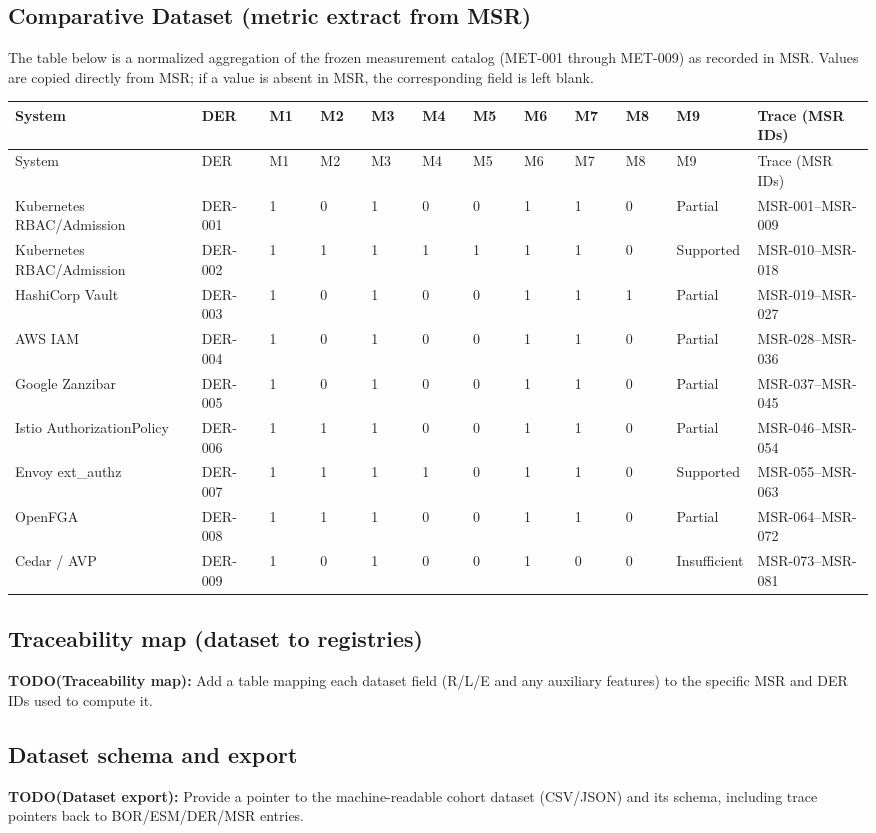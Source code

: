 \subsection{Comparative Dataset (metric extract from MSR)}
The table below is a normalized aggregation of the frozen measurement catalog (MET-001 through MET-009) as recorded in MSR. Values are copied directly from MSR; if a value is absent in MSR, the corresponding field is left blank.

\begin{center}
\begin{longtable}{@{}p{0.22\linewidth}p{0.08\linewidth}p{0.06\linewidth}p{0.06\linewidth}p{0.06\linewidth}p{0.06\linewidth}p{0.06\linewidth}p{0.06\linewidth}p{0.06\linewidth}p{0.06\linewidth}p{0.08\linewidth}p{0.18\linewidth}@{}}
\toprule
System & DER & M1 & M2 & M3 & M4 & M5 & M6 & M7 & M8 & M9 & Trace (MSR IDs)\\
\midrule
\endfirsthead
\toprule
System & DER & M1 & M2 & M3 & M4 & M5 & M6 & M7 & M8 & M9 & Trace (MSR IDs)\\
\midrule
\endhead
\bottomrule
\endfoot
\bottomrule
\endlastfoot
Kubernetes RBAC/Admission & DER-001 & 1 & 0 & 1 & 0 & 0 & 1 & 1 & 0 & Partial & MSR-001--MSR-009\\
Kubernetes RBAC/Admission & DER-002 & 1 & 1 & 1 & 1 & 1 & 1 & 1 & 0 & Supported & MSR-010--MSR-018\\
HashiCorp Vault & DER-003 & 1 & 0 & 1 & 0 & 0 & 1 & 1 & 1 & Partial & MSR-019--MSR-027\\
AWS IAM & DER-004 & 1 & 0 & 1 & 0 & 0 & 1 & 1 & 0 & Partial & MSR-028--MSR-036\\
Google Zanzibar & DER-005 & 1 & 0 & 1 & 0 & 0 & 1 & 1 & 0 & Partial & MSR-037--MSR-045\\
Istio AuthorizationPolicy & DER-006 & 1 & 1 & 1 & 0 & 0 & 1 & 1 & 0 & Partial & MSR-046--MSR-054\\
Envoy ext\_authz & DER-007 & 1 & 1 & 1 & 1 & 0 & 1 & 1 & 0 & Supported & MSR-055--MSR-063\\
OpenFGA & DER-008 & 1 & 1 & 1 & 0 & 0 & 1 & 1 & 0 & Partial & MSR-064--MSR-072\\
Cedar / AVP & DER-009 & 1 & 0 & 1 & 0 & 0 & 1 & 0 & 0 & Insufficient & MSR-073--MSR-081\\
\end{longtable}
\end{center}

\subsection{Traceability map (dataset to registries)}
\textbf{TODO(Traceability map):} Add a table mapping each dataset field (R/L/E and any auxiliary features) to the specific MSR and DER IDs used to compute it.

\subsection{Dataset schema and export}
\textbf{TODO(Dataset export):} Provide a pointer to the machine-readable cohort dataset (CSV/JSON) and its schema, including trace pointers back to BOR/ESM/DER/MSR entries.
